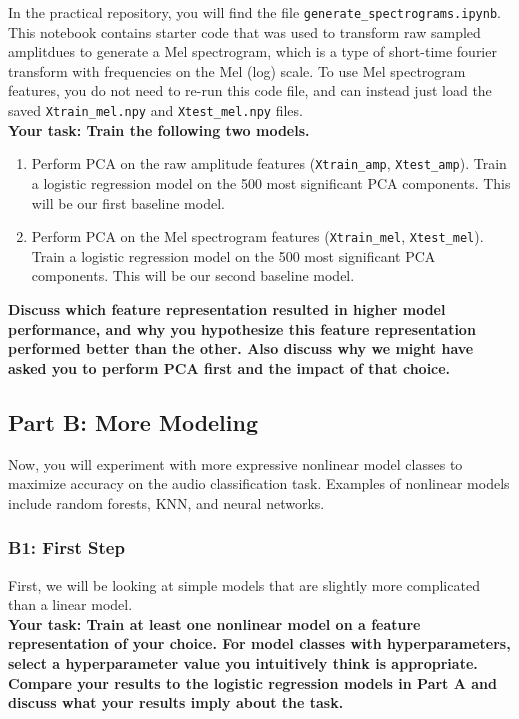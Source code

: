 \documentclass[12pt]{article}
\begin{document}
\noindent In the practical repository, you will find the file \verb|generate_spectrograms.ipynb|. This notebook contains starter code that was used to transform raw sampled amplitdues to generate a Mel spectrogram, which is a type of short-time fourier transform with frequencies on the Mel (log) scale.  To use Mel spectrogram features, you do not need to re-run this code file, and can instead just load the saved \texttt{Xtrain\_mel.npy} and \texttt{Xtest\_mel.npy} files.\\
 
\noindent \textbf{Your task: Train the following two models.}
\begin{enumerate}
    \item Perform PCA on the raw amplitude features (\texttt{Xtrain\_amp}, \texttt{Xtest\_amp}).  Train a logistic regression model on the  500 most significant PCA components. This will be our first baseline model.
    \item Perform PCA on the Mel spectrogram features (\texttt{Xtrain\_mel}, \texttt{Xtest\_mel}).  Train a logistic regression model on the 500 most significant PCA components. This will be our second baseline model.
\end{enumerate}
\textbf{Discuss which feature representation resulted in higher model performance, and why you hypothesize this feature representation performed better than the other.  Also discuss why we might have asked you to perform PCA first and the impact of that choice.}

\subsection{Part B: More Modeling}

Now, you will experiment with more expressive nonlinear model classes to maximize accuracy on the audio classification task.  Examples of nonlinear models include random forests, KNN, and neural networks.\\

\subsubsection{B1: First Step}

First, we will be looking at simple models that are slightly more complicated than a linear model. \\

\noindent \textbf{Your task: Train at least one nonlinear model on a feature representation of your choice. For model classes with hyperparameters, select a hyperparameter value you intuitively think is appropriate.  Compare your results to the logistic regression models in Part A and discuss what your results imply about the task.}\\
\end{document}
